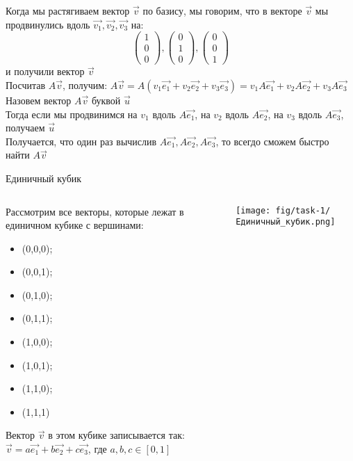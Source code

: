 \begin{frame}{}
Когда мы растягиваем вектор $\vec{v}$ по базису, мы говорим, что в векторе $\vec{v}$ мы продвинулись вдоль $\vec{v_{1}}, \vec{v_{2}},\vec{v_{3}}$ на:
\[
\left(\begin{array}{l}
    1 \\
    0 \\
    0
\end{array}\right),
\left(\begin{array}{l}
    0 \\
    1 \\
    0
\end{array}\right),
\left(\begin{array}{l}
    0 \\
    0 \\
    1
\end{array}\right)
\]
и получили вектор $\vec{v}$ \\
Посчитав $A\vec{v}$, получим: $A\vec{v} = A(v_{1}\vec{e_{1}} + v_{2}\vec{e_{2}} +v_{3}\vec{e_{3}}) = v_{1}A\vec{e_{1}} + v_{2}A\vec{e_{2}} +v_{3}A\vec{e_{3}}$ \\
Назовем вектор $A\vec{v}$ буквой $\vec{u}$ \\
Тогда если мы продвинимся на $v_{1}$ вдоль $A\vec{e_{1}}$, на $v_{2}$ вдоль $A\vec{e_{2}}$, на $v_{3}$ вдоль $A\vec{e_{3}}$, получаем $\vec{u}$\\
Получается, что один раз вычислив $A\vec{e_{1}}, A\vec{e_{2}}, A\vec{e_{3}}$, то всегдо сможем быстро найти $A\vec{v}$
\end{frame}


\begin{frame}{Единичный кубик}
\begin{columns}
\begin{column}{0.5\paperwidth}
Рассмотрим все векторы, которые лежат в единичном кубике с вершинами: 
\begin{itemize}
    \item (0,0,0);
    \item (0,0,1);
    \item (0,1,0);
    \item (0,1,1);
    \item (1,0,0);
    \item (1,0,1);
    \item (1,1,0);
    \item (1,1,1)
\end{itemize}
Вектор $\vec{v}$ в этом кубике записывается так: $\vec{v} = a\vec{e_{1}}+b\vec{e_{2}}+c\vec{e_{3}}$, где $a,b,c \in [0, 1]$
\end{column}
\begin{column}{0.4\paperwidth}
\texttt{[image: fig/task-1/Единичный\_кубик.png]}
\end{column}
\end{columns}   
\end{frame}

